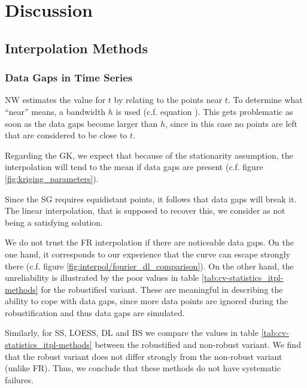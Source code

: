 \chapter{Discussion}


\section{Interpolation Methods}{ \label{sec:discussion_itpl}
    \subsection{Data Gaps in Time Series}\label{sec:discussion_itpl_data_gaps}{
        NW estimates the value for $t$ by relating to the points near $t$. To determine what ``near'' means, a bandwidth $h$ is used (c.f. equation ). This gets problematic as soon as the data gaps become larger than $h$, since in this case no points are left that are considered to be close to $t$. 

        Regarding the GK, we expect that because of the stationarity assumption, the interpolation will tend to the mean if data gaps are present (c.f. figure \ref{fig:kriging_parameters}). 

        Since the SG requires equidistant points, it follows that data gaps will break it. The linear interpolation, that is supposed to recover this, we consider as not being a satisfying solution.

        We do not trust the FR interpolation if there are noticeable data gaps. On the one hand, it corresponds to our experience that the curve can escape strongly there (c.f. figure \ref{fig:interpol/fourier_dl_comparison}). On the other hand, the unreliability is illustrated by the poor values in table \ref{tab:cv-statistics_itpl-methods} for the robustified variant. These are meaningful in describing the ability to cope with data gaps, since more data points are ignored during the robustification and thus data gaps are simulated. 

        Similarly, for SS, LOESS, DL and BS we compare the values in table \ref{tab:cv-statistics_itpl-methods} between the robustified and non-robust variant. We find that the robust variant does not differ strongly from the non-robust variant (unlike FR). Thus, we conclude that these methods do not have systematic failures.

}}

